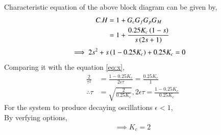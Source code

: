 \documentclass[journal,12pt,twocolumn]{IEEEtran}
\theoremstyle{remark}
\begin{document}
Characteristic equation of the above block diagram can be given by,
\begin{align}
     C.H &= 1+G_c G_f G_p G_M   \\
     &= 1+\frac{0.25 K_c \left(1-s\right) }{s\left(2s+1\right)} 
\end{align}
\begin{align}
    \implies 2s^2+s\left(1-0.25K_c\right)+0.25K_c&=0  
\end{align}
Comparing it with the equation \eqref{eq:x},
\begin{align}
    \frac{2}{\tau^2}&=\frac{1-0.25K_c}{2\epsilon \tau}=\frac{0.25K_c}{1}    \\
    \therefore \tau&=\sqrt{\frac{2}{0.25K_c}} , 2\epsilon\tau=\frac{1-0.25K_c}{0.25K_c}
\end{align}
For the system to produce decaying oscillations {$\epsilon <1$},    \\
By verfying options,
\begin{align}
    \implies K_c=2
\end{align}
\end{document}
